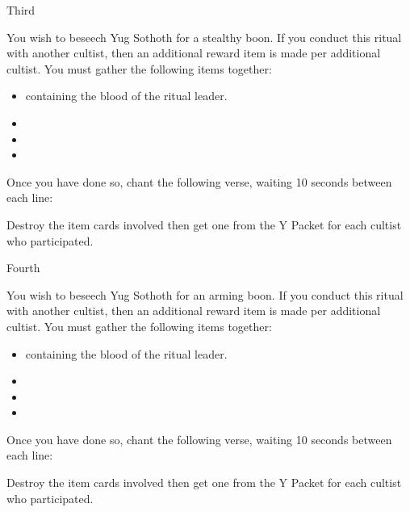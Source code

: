 \documentclass[greennotebook]{guildcamp4} %
\begin{document}
\begin{page}{Third}
	
		You wish to beseech Yug Sothoth for a stealthy boon. If you conduct this ritual with another cultist, then an additional reward item is made per additional cultist. You must gather the following items together: 
		
		\begin{itemize}
			\item \iTestTube{} containing the blood of the ritual leader.
			\item \iGlassLens{}
			\item \iCauldron{}
			\item \iChemicalV{}
		\end{itemize}		
		
		Once you have done so, chant the following verse, waiting 10 seconds between each line:
		
		
		Destroy the item cards involved then get one \iInvisibilityCloak{} from the Y Packet for each cultist who participated.
	
\end{page}

\begin{page}{Fourth}
	
			You wish to beseech Yug Sothoth for an arming boon. If you conduct this ritual with another cultist, then an additional reward item is made per additional cultist. You must gather the following items together: 
		
		\begin{itemize}
			\item \iTestTube{} containing the blood of the ritual leader.
			\item \iMultitool{}
			\item \iScrapMetal{}
			\item \iWrench {}
		\end{itemize}		
		
		Once you have done so, chant the following verse, waiting 10 seconds between each line:
		
		
		Destroy the item cards involved then get one \iCRUpPotion{} from the Y Packet for each cultist who participated.
	
\end{page}
\end{document}
